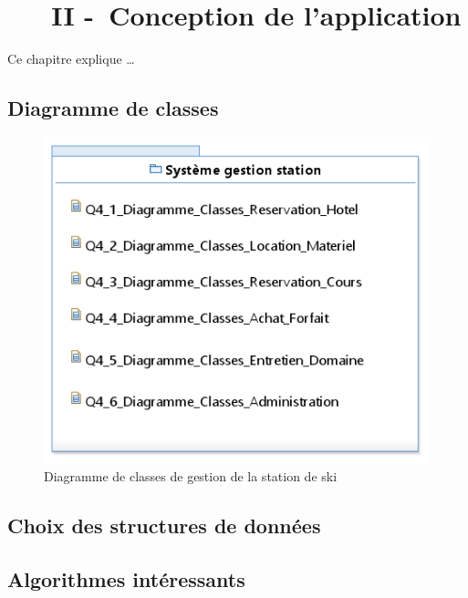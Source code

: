 \chapter[~~~CONCEPTION DE L'APPLICATION]{~~~II -~Conception de l’application}%
\label{refDev2}%

Ce chapitre explique \dots

\section{Diagramme de classes}

\begin{figure}[!ht]
  \centering%
  \includegraphics[width=15.5cm]{assets/pictures/Q4___Diagramme_Classes_Systeme_Gestion_Station_de_Ski.png} 
  \caption{Diagramme de classes de gestion de la station de ski}%
\end{figure}
\bigskip
\newpage

\section{Choix des structures de données}

\section{Algorithmes intéressants}


